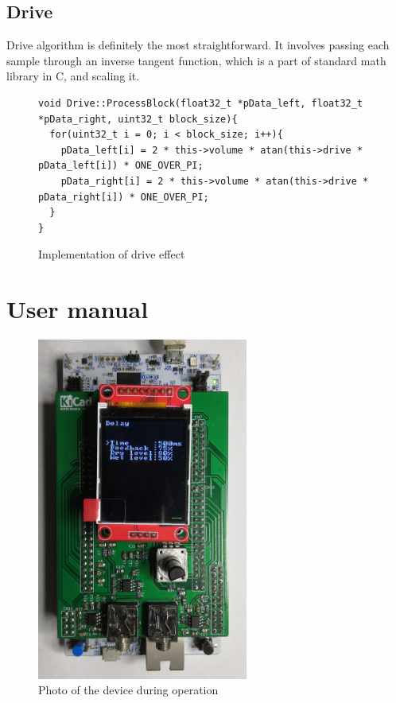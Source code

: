 \documentclass[a4paper,twoside,12pt]{book}
\begin{document}
\subsection{Drive}
Drive algorithm is definitely the most straightforward.
It involves passing each sample through an inverse tangent function,
which is a part of standard math library in C, and scaling it.

\begin{figure}[H]
\centering
\begin{lstlisting}
void Drive::ProcessBlock(float32_t *pData_left, float32_t *pData_right, uint32_t block_size){
  for(uint32_t i = 0; i < block_size; i++){
    pData_left[i] = 2 * this->volume * atan(this->drive * pData_left[i]) * ONE_OVER_PI;
    pData_right[i] = 2 * this->volume * atan(this->drive * pData_right[i]) * ONE_OVER_PI;
  }
}
\end{lstlisting}
\caption{Implementation of drive effect}
\label{fig:Drv}
\end{figure}


\section{User manual}

\begin{figure}[H]
    \centering
    \includegraphics[angle=90,width=0.618\textwidth]{images/photo_working}
    \caption{Photo of the device during operation}
    \label{fig:working}
\end{figure}
\end{document}
